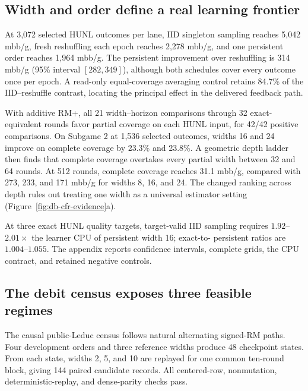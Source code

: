 \subsection{Width and order define a real learning frontier}

At 3,072 selected HUNL outcomes per lane, IID singleton sampling reaches
5,042 mbb/g, fresh reshuffling each epoch reaches 2,278 mbb/g, and one
persistent order reaches 1,964 mbb/g.  The persistent improvement over
reshuffling is 314 mbb/g (95\% interval $[282,349]$), although both schedules
cover every outcome once per epoch.  A read-only equal-coverage averaging
control retains 84.7\% of the IID--reshuffle contrast, locating the principal
effect in the delivered feedback path.

With additive RM+, all 21 width--horizon comparisons through 32 exact-
equivalent rounds favor partial coverage on each HUNL input, for 42/42 positive
comparisons.  On Subgame 2 at 1,536 selected outcomes, widths 16 and 24 improve
on complete coverage by 23.3\% and 23.8\%.  A geometric depth ladder then
finds that complete coverage overtakes every partial width between 32 and 64
rounds.  At 512 rounds, complete coverage reaches 31.1 mbb/g, compared with
273, 233, and 171 mbb/g for widths 8, 16, and 24.  The changed ranking across
depth rules out treating one width as a universal estimator setting
(Figure~\ref{fig:db-cfr-evidence}a).

At three exact HUNL quality targets, target-valid IID sampling requires
$1.92$--$2.01\times$ the learner CPU of persistent width 16; exact-to-
persistent ratios are $1.004$--$1.055$.  The appendix reports confidence
intervals, complete grids, the CPU contract, and retained negative controls.

\subsection{The debit census exposes three feasible regimes}

The causal public-Leduc census follows natural alternating signed-RM paths.
Four development orders and three reference widths produce 48 checkpoint
states.  From each state, widths 2, 5, and 10 are replayed for one common
ten-round block, giving 144 paired candidate records.  All centered-row,
nonmutation, deterministic-replay, and dense-parity checks pass.

